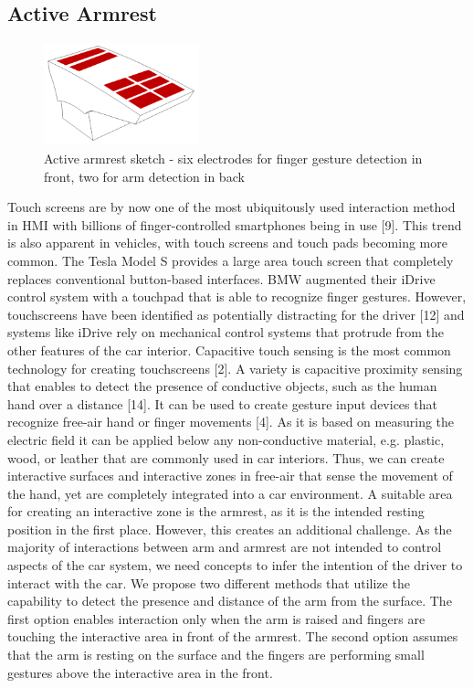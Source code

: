 \subsection{Active Armrest}
\begin{figure}[h]
\centering
\includegraphics[width=0.4\textwidth]{images/active_armrest}
\caption{Active armrest sketch - six electrodes for finger gesture detection in front, two for arm detection in back}
\label{fig:armrest_sketch}
\end{figure}
Touch screens are by now one of the most ubiquitously used interaction method in HMI with billions of finger-controlled smartphones being in use [9]. This trend is also apparent in vehicles, with touch screens and touch pads becoming more common. The Tesla Model S provides a large area touch screen that completely replaces conventional button-based interfaces. BMW augmented their iDrive control system with a touchpad that is able to recognize finger gestures. However, touchscreens have been identified as potentially distracting for the driver [12] and systems like iDrive rely on mechanical control systems that protrude from the other features of the car interior. Capacitive touch sensing is the most common technology for creating touchscreens [2]. A variety is capacitive proximity sensing that enables to detect the presence of conductive objects, such as the human hand over a distance [14]. It can be used to create gesture input devices that recognize free-air hand or finger movements [4]. As it is based on measuring the electric field it can be applied below any non-conductive material, e.g. plastic, wood, or leather that are commonly used in car interiors. Thus, we can create interactive surfaces and interactive zones in free-air that sense the movement of the hand, yet are completely integrated into a car environment. 
A suitable area for creating an interactive zone is the armrest, as it is the intended resting position in the first place. However, this creates an additional challenge. As the majority of interactions between arm and armrest are not intended to control aspects of the car system, we need concepts to infer the intention of the driver to interact with the car. We propose two different methods that utilize the capability to detect the presence and distance of the arm from the surface. The first option enables interaction only when the arm is raised and fingers are touching the interactive area in front of the armrest. The second option assumes that the arm is resting on the surface and the fingers are performing small gestures above the interactive area in the front. 
